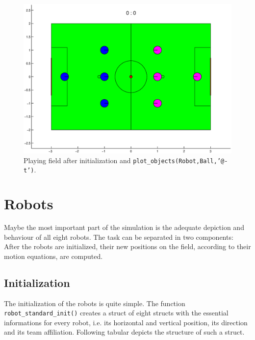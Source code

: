 \begin{figure}[h]
	\centering
    	\includegraphics[width=14cm]{./2_Simulation/playing_field_robots}
  	\caption{Playing field after initialization and \texttt{plot\_objects(Robot,Ball,'@-t')}.}
  	\label{Playing_field_robots}
\end{figure}


\section{Robots} \label{Robotsection}

Maybe the most important part of the simulation is the adequate depiction and behaviour of all eight robots. The task can be separated in two components: After the robots are initialized, their new positions on the field, according to their motion equations, are computed.

\subsection*{Initialization}
The initialization of the robots is quite simple. The function \texttt{ robot\_standard\_init()} creates a struct of eight structs with the essential informations for every robot, i.e. its horizontal and vertical position, its direction and its team affiliation. Following tabular depicts the structure of such a struct.

